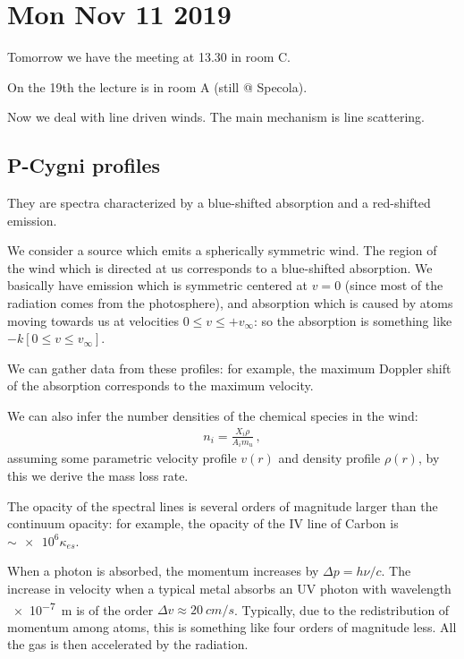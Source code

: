 \documentclass[main.tex]{subfiles}
\begin{document}
\section*{Mon Nov 11 2019}

Tomorrow we have the meeting at 13.30 in room C.

On the 19th the lecture is in room A (still @ Specola).

Now we deal with line driven winds.
The main mechanism is line scattering.

\subsection{P-Cygni profiles}

They are spectra characterized  by a blue-shifted absorption and a red-shifted emission.

We consider a source which emits a spherically symmetric wind.
The region of the wind which is directed at us corresponds to a blue-shifted absorption.
We basically have emission which is symmetric centered at \(v=0\) (since most of the radiation comes from the photosphere), and absorption which is caused by atoms moving towards us at velocities \(0 \leq v \leq + v_\infty\): so the absorption is something like \(- k [0 \leq v \leq v_\infty]\).

We can gather data from these profiles: for example, the maximum Doppler shift of the absorption corresponds to the maximum velocity.

We can also infer the number densities of the chemical species in the wind: 
%
\begin{align}
  n_i  = \frac{X_i \rho }{A_i m_u}
\,,
\end{align}
%
assuming some parametric velocity profile \(v(r)\) and density profile \(\rho (r)\), by this we derive the mass loss rate.

The opacity of the spectral lines is several orders of magnitude larger than the continuum opacity: for example, the opacity of the IV line of Carbon is \(\sim \num{e6} \kappa_{es}\).

When a photon is absorbed, the momentum increases by \(\Delta p = h \nu / c \). 
The increase in velocity when a typical metal absorbs an UV photon with wavelength \SI{e-7}{m} is of the order \(\Delta v \approx \SI{20}{cm/s}\). Typically, due to the redistribution of momentum among atoms, this is something like four orders of magnitude less.
All the gas is then accelerated by the radiation.
\end{document}
